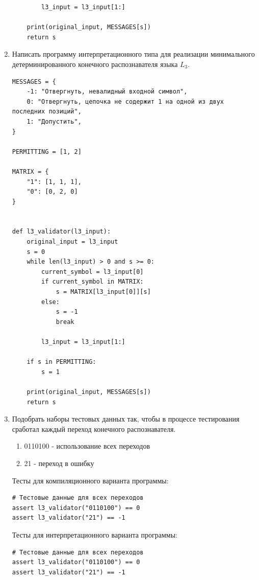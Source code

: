 \documentclass[a4paper,14pt]{extarticle}
\begin{document}
\begin{enumerate}[1.]
\begin{verbatim}
        l3_input = l3_input[1:]

    print(original_input, MESSAGES[s])
    return s
\end{verbatim}

\item Написать программу интерпретационного типа для реализации
минимального детерминированного конечного распознавателя языка $L_3$.

\begin{verbatim}
MESSAGES = {
    -1: "Отвергнуть, невалидный входной символ",
    0: "Отвергнуть, цепочка не содержит 1 на одной из двух последних позиций",
    1: "Допустить",
}

PERMITTING = [1, 2]

MATRIX = {
    "1": [1, 1, 1],
    "0": [0, 2, 0]
}


def l3_validator(l3_input):
    original_input = l3_input
    s = 0
    while len(l3_input) > 0 and s >= 0:
        current_symbol = l3_input[0]
        if current_symbol in MATRIX:
            s = MATRIX[l3_input[0]][s]
        else:
            s = -1
            break

        l3_input = l3_input[1:]

    if s in PERMITTING:
        s = 1

    print(original_input, MESSAGES[s])
    return s
\end{verbatim}

\item Подобрать наборы тестовых данных так, чтобы в процессе тестирования
сработал каждый переход конечного распознавателя.

\begin{enumerate}
    \item 0110100 - использование всех переходов
    \item 21 - переход в ошибку
\end{enumerate}

Тесты для компиляционного варианта программы:\\
\begin{verbatim}
# Тестовые данные для всех переходов
assert l3_validator("0110100") == 0
assert l3_validator("21") == -1
\end{verbatim}

Тесты для интерпретационного варианта программы:\\
\begin{verbatim}
# Тестовые данные для всех переходов
assert l3_validator("0110100") == 0
assert l3_validator("21") == -1
\end{verbatim}


\end{enumerate}
\end{document}
